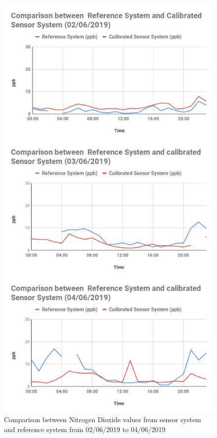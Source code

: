 \begin{figure}[h]
  \begin{center}
  \includegraphics[scale=0.45]{images/figure82no.png}
  \end{center}
  \caption{Comparison between Nitrogen Dioxide values from sensor system and reference system from 02/06/2019 to 04/06/2019}
  \label{Nitrogen1}

\end{figure}
\clearpage






